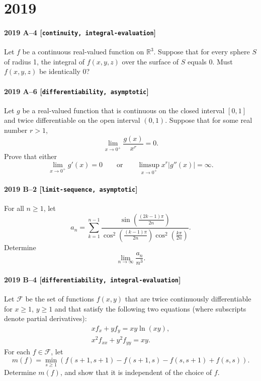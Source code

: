 \documentclass[11pt]{article}
\begin{document}
\section*{2019}

\paragraph{2019 A--4 \textnormal{[\texttt{continuity, integral-evaluation}]}}
Let $f$ be a continuous real-valued function on $\mathbb{R}^3$. Suppose that for every sphere $S$ of radius 1,
the integral of $f(x,y,z)$ over the surface of $S$ equals 0. Must $f(x,y,z)$ be identically 0?

\paragraph{2019 A--6 \textnormal{[\texttt{differentiability, asymptotic}]}}
Let $g$ be a real-valued function that is continuous on the closed interval $[0,1]$ and twice differentiable on
the open interval $(0,1)$. Suppose that for some real number $r>1$,
\[
\lim_{x \to 0^+} \frac{g(x)}{x^r} = 0.
\]
Prove that either
\[
\lim_{x \to 0^+} g'(x) = 0 \qquad \mbox{or} \qquad \limsup_{x \to 0^+} x^r |g''(x)| = \infty.
\]

\paragraph{2019 B--2 \textnormal{[\texttt{limit-sequence, asymptotic}]}}
For all $n \geq 1$, let
\[
a_n = \sum_{k=1}^{n-1} \frac{\sin \left( \frac{(2k-1)\pi}{2n} \right)}{\cos^2 \left( \frac{(k-1)\pi}{2n} \right) \cos^2 \left( \frac{k\pi}{2n} \right)}.
\]
Determine
\[
\lim_{n \to \infty} \frac{a_n}{n^3}.
\]

\paragraph{2019 B--4 \textnormal{[\texttt{differentiability, integral-evaluation}]}}
Let $\mathcal{F}$ be the set of functions $f(x,y)$ that are twice continuously differentiable for $x \geq 1$, $y \geq 1$ and that satisfy the following two equations (where subscripts denote partial derivatives):
\begin{gather*}
xf_x + yf_y = xy \ln(xy), \\
x^2 f_{xx} + y^2 f_{yy} = xy.
\end{gather*}
For each $f \in \mathcal{F}$, let
\[
m(f) = \min_{s \geq 1} \left(f(s+1,s+1) - f(s+1,s) - f(s,s+1) + f(s,s) \right).
\]
Determine $m(f)$, and show that it is independent of the choice of $f$.
\end{document}
